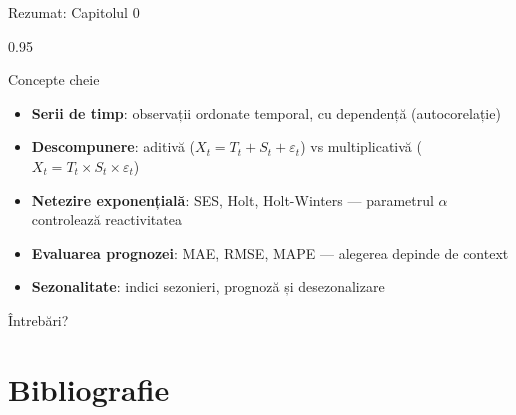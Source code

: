 \documentclass[9pt, aspectratio=169, t]{beamer}
\begin{document}
\begin{frame}{Rezumat: Capitolul 0}
    \begin{cminipage}{0.95\textwidth}
    \begin{exampleblock}{Concepte cheie}
        \begin{itemize}\setlength{\itemsep}{2pt}
            \item[\textcolor{MainBlue}{\textbf{1.}}] \textbf{Serii de timp}: observații ordonate temporal, cu dependență (autocorelație)
            \item[\textcolor{MainBlue}{\textbf{2.}}] \textbf{Descompunere}: aditivă ($X_t = T_t + S_t + \varepsilon_t$) vs multiplicativă ($X_t = T_t \times S_t \times \varepsilon_t$)
            \item[\textcolor{MainBlue}{\textbf{3.}}] \textbf{Netezire exponențială}: SES, Holt, Holt-Winters --- parametrul $\alpha$ controlează reactivitatea
            \item[\textcolor{MainBlue}{\textbf{4.}}] \textbf{Evaluarea prognozei}: MAE, RMSE, MAPE --- alegerea depinde de context
            \item[\textcolor{MainBlue}{\textbf{5.}}] \textbf{Sezonalitate}: indici sezonieri, prognoză și desezonalizare
        \end{itemize}
    \end{exampleblock}

    \vspace{0.5cm}
    \begin{center}
        \Large\textcolor{MainBlue}{Întrebări?}
    \end{center}
    \end{cminipage}
\end{frame}
\section{Bibliografie}
\end{document}
